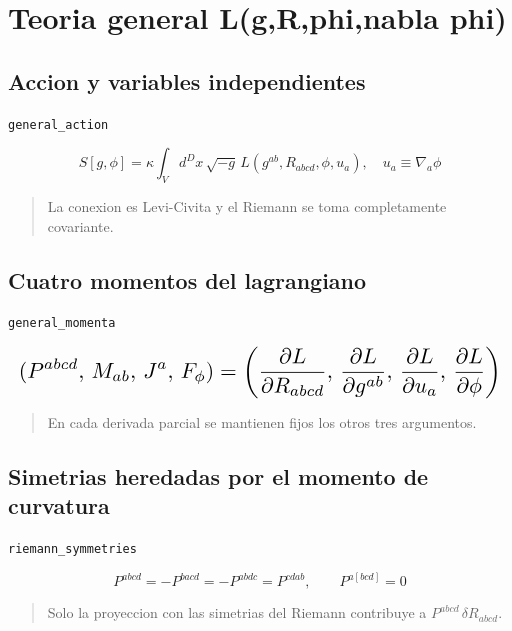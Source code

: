 \documentclass[11pt,a4paper]{article}
\begin{document}
\section{Teoria general L(g,R,phi,nabla phi)}

\subsection{Accion y variables independientes}

\noindent\texttt{general\_action}\par\nopagebreak[4]

\[
S[g,\phi] = \kappa\int_V d^Dx\,\sqrt{-g}\,L(g^{ab},R_{abcd},\phi,u_a),\quad u_a\equiv\nabla_a\phi
\]

\begin{quote}\small La conexion es Levi-Civita y el Riemann se toma completamente covariante.\end{quote}

\subsection{Cuatro momentos del lagrangiano}

\noindent\texttt{general\_momenta}\par\nopagebreak[4]

\[
\resizebox{\textwidth}{!}{$\displaystyle (P^{abcd},\,M_{ab},\,J^a,\,F_\phi) = \left(\frac{\partial L}{\partial R_{abcd}},\,\frac{\partial L}{\partial g^{ab}},\,\frac{\partial L}{\partial u_a},\,\frac{\partial L}{\partial\phi}\right)$}
\]

\begin{quote}\small En cada derivada parcial se mantienen fijos los otros tres argumentos.\end{quote}

\subsection{Simetrias heredadas por el momento de curvatura}

\noindent\texttt{riemann\_symmetries}\par\nopagebreak[4]

\[
P^{abcd} = -P^{bacd}=-P^{abdc}=P^{cdab},\qquad P^{a[bcd]}=0
\]

\begin{quote}\small Solo la proyeccion con las simetrias del Riemann contribuye a \(P^{abcd}\,\delta R_{abcd}\).\end{quote}
\end{document}
